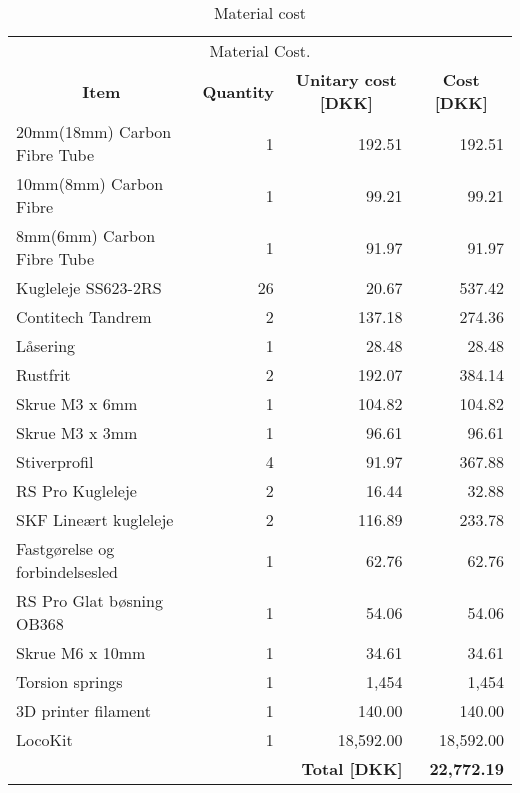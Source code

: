 \begin{table}[htbp]
\caption{Material cost}
\centering
\begin{tabular}{l|r|r|r}
\multicolumn{4}{c}{\Large Material Cost.} \\
\multicolumn{1}{c|}{\textbf{Item}} & \multicolumn{1}{c|}{\textbf{Quantity}} & \multicolumn{1}{c|}{\textbf{Unitary cost [DKK]}} & \multicolumn{1}{c}{\textbf{Cost [DKK]}} \\ \hline
20mm(18mm) Carbon Fibre Tube & 1 & 192.51 & 192.51 \\ \hline
10mm(8mm) Carbon Fibre & 1 & 99.21 & 99.21 \\ \hline
8mm(6mm) Carbon Fibre Tube & 1 & 91.97 & 91.97 \\ \hline
Kugleleje SS623-2RS & 26 & 20.67 & 537.42 \\ \hline
Contitech Tandrem & 2 & 137.18 & 274.36 \\ \hline
Låsering & 1 & 28.48 & 28.48 \\ \hline
Rustfrit & 2 & 192.07 & 384.14 \\ \hline
Skrue M3 x 6mm & 1 & 104.82 & 104.82 \\ \hline
Skrue M3 x 3mm & 1 & 96.61 & 96.61 \\ \hline
Stiverprofil & 4 & 91.97 & 367.88 \\ \hline
RS Pro Kugleleje & 2 & 16.44 & 32.88 \\ \hline
SKF Lineært kugleleje & 2 & 116.89 & 233.78 \\ \hline
Fastgørelse og forbindelsesled & 1 & 62.76 & 62.76 \\ \hline
RS Pro Glat bøsning OB368 & 1 & 54.06 & 54.06 \\ \hline
Skrue M6 x 10mm & 1 & 34.61 & 34.61 \\ \hline
Torsion springs & 1 & 1,454 & 1,454 \\ \hline
3D printer filament & 1 & 140.00 & 140.00 \\ \hline
LocoKit  & 1 & 18,592.00 & 18,592.00 \\ \hline
\multicolumn{2}{l}{} & \textbf{Total [DKK]} & \textbf{22,772.19} \\
\end{tabular}
\label{tab:material_cost}
\end{table}


